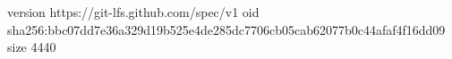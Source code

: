 version https://git-lfs.github.com/spec/v1
oid sha256:bbc07dd7e36a329d19b525e4de285dc7706cb05cab62077b0c44afaf4f16dd09
size 4440
